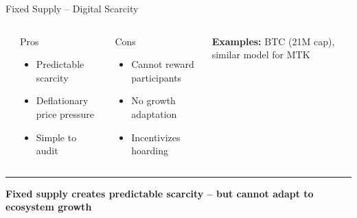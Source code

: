 \documentclass[8pt,aspectratio=169]{beamer}
\newcommand{\bottomnote}[1]{\vfill\vspace{-2mm}\textcolor{mllavender2}{\rule{\textwidth}{0.4pt}}\vspace{1mm}\footnotesize\textbf{#1}}
\begin{document}
\begin{frame}{Fixed Supply -- Digital Scarcity}
  \begin{columns}[T]
      \begin{center}
      \end{center}

      \begin{block}{\textcolor{mlgreen}{\checkmark} Pros}
        \begin{itemize}\setlength\itemsep{2pt}
          \item[\textcolor{mlgreen}{\textbullet}] Predictable scarcity
          \item[\textcolor{mlgreen}{\textbullet}] Deflationary price pressure
          \item[\textcolor{mlgreen}{\textbullet}] Simple to audit
        \end{itemize}
      \end{block}
      \begin{alertblock}{\textcolor{mlred}{\texttimes} Cons}
        \begin{itemize}\setlength\itemsep{2pt}
          \item[\textcolor{mlred}{\textbullet}] Cannot reward participants
          \item[\textcolor{mlred}{\textbullet}] No growth adaptation
          \item[\textcolor{mlred}{\textbullet}] Incentivizes hoarding
        \end{itemize}
      \end{alertblock}
      \smallskip
      {\scriptsize\textbf{Examples:} BTC (21M cap), similar model for MTK}
  \end{columns}
  \bottomnote{Fixed supply creates predictable scarcity -- but cannot adapt to ecosystem growth}
\end{frame}
\end{document}
